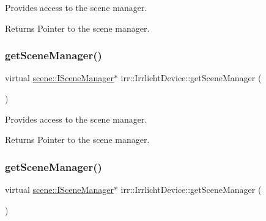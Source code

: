 Provides access to the scene manager. 

\begin{DoxyReturn}{Returns}
Pointer to the scene manager. 
\end{DoxyReturn}
\mbox{\label{classirr_1_1IrrlichtDevice_a891b503ff4d5041296d88f23f97d7b3d}} 
\subsubsection{\texorpdfstring{get\+Scene\+Manager()}{getSceneManager()}\hspace{0.1cm}{\footnotesize\ttfamily [2/3]}}
{\footnotesize\ttfamily virtual \hyperlink{classirr_1_1scene_1_1ISceneManager}{scene\+::\+I\+Scene\+Manager}$\ast$ irr\+::\+Irrlicht\+Device\+::get\+Scene\+Manager (\begin{DoxyParamCaption}{ }\end{DoxyParamCaption})\hspace{0.3cm}{\ttfamily [pure virtual]}}



Provides access to the scene manager. 

\begin{DoxyReturn}{Returns}
Pointer to the scene manager. 
\end{DoxyReturn}
\mbox{\label{classirr_1_1IrrlichtDevice_a891b503ff4d5041296d88f23f97d7b3d}} 
\subsubsection{\texorpdfstring{get\+Scene\+Manager()}{getSceneManager()}\hspace{0.1cm}{\footnotesize\ttfamily [3/3]}}
{\footnotesize\ttfamily virtual \hyperlink{classirr_1_1scene_1_1ISceneManager}{scene\+::\+I\+Scene\+Manager}$\ast$ irr\+::\+Irrlicht\+Device\+::get\+Scene\+Manager (\begin{DoxyParamCaption}{ }\end{DoxyParamCaption})\hspace{0.3cm}{\ttfamily [pure virtual]}}



